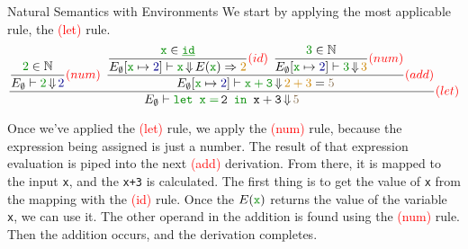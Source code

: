 \begin{example}[Lecture 3]{Natural Semantics with Environments}
  We start by applying the most applicable rule, the \textcolor{red}{(let)} rule.
  \begin{equation*}
    \dfrac{
      \dfrac{\textcolor{Green4}{2} \in \NaturalNumbers}{E_{\emptyset} \vdash \textcolor{Green4}{2} \EvaluatesTo \textcolor{Blue4}{2}} \textcolor{red}{(num)} \:\:
      \dfrac{
        \dfrac{\textcolor{Green4}{\mathtt{x}} \in \textcolor{Green4}{\mathtt{\underline{id}}}}
        {E_{\emptyset} [\textcolor{Green4}{\mathtt{x}} \mapsto \textcolor{Blue4}{2}] \vdash \textcolor{Green4}{\mathtt{x}} \EvaluatesTo E(\textcolor{Green4}{\mathtt{x}}) \Rightarrow \textcolor{Orange3}{2}} \textcolor{red}{(id)} \:\:
        \dfrac{\textcolor{Green4}{3} \in \NaturalNumbers}
        {E_{\emptyset} [\textcolor{Green4}{\mathtt{x}} \mapsto \textcolor{Blue4}{2}] \vdash \textcolor{Green4}{3} \EvaluatesTo \textcolor{Orange3}{3}} \textcolor{red}{(num)}}
      {E_{\emptyset}[\textcolor{Green4}{\mathtt{x}} \mapsto \textcolor{Blue4}{2}] \vdash \textcolor{Green4}{\mathtt{x+3}} \EvaluatesTo \textcolor{Orange3}{2+3} = \textcolor{Burlywood4}{5}} \textcolor{red}{(add)}}
    {E_{\emptyset} \vdash \textcolor{Green4}{\text{\texttt{let }}} \mathtt{\textcolor{Green4}{x=}\,2} \textcolor{Green4}{\text{\texttt{ in }}} \mathtt{x+3} \EvaluatesTo \textcolor{Burlywood4}{5}} \textcolor{red}{(let)}
  \end{equation*}

  Once we've applied the \textcolor{red}{(let)} rule, we apply the \textcolor{red}{(num)} rule, because the expression being assigned is just a number.
  The result of that expression evaluation is piped into the next \textcolor{red}{(add)} derivation.
  From there, it is mapped to the input \textcolor{Green4}{\texttt{x}}, and the \texttt{x+3} is calculated.
  The first thing is to get the value of \textcolor{Green4}{\texttt{x}} from the mapping with the \textcolor{red}{(id)} rule.
  Once the $E(\textcolor{Green4}{\mathtt{x}})$ returns the value of the variable \textcolor{Green4}{\texttt{x}}, we can use it.
  The other operand in the addition is found using the \textcolor{red}{(num)} rule.
  Then the addition occurs, and the derivation completes.
\end{example}
  
